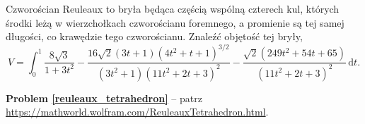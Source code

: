 %

\begin{problem_with_solution}
    \label{reuleaux_tetrahedron}%
    Czworościan Reuleaux to bryła będąca częścią wspólną czterech kul, których środki leżą w wierzchołkach czworościanu foremnego, a promienie są tej samej długości, co krawędzie tego czworościanu.
    Znaleźć objętość tej bryły,
    \begin{equation}
        V = \int_0^1
        \frac{
            8\sqrt{3}
        }{
            1 + 3t^2
        } - \frac{
            16 \sqrt{2} (3t+1) (4t^2 +t+1)^{3/2}
        }{
            (3t^2+1)(11t^2 + 2t + 3)^2
        } - \frac{
            \sqrt{2} (249 t^2 + 54t + 65)
        }{
            (11t^2 + 2t +3)^2
        } \,\mathrm{d} t.
    \end{equation}
\end{problem_with_solution}

\textbf{Problem \ref{reuleaux_tetrahedron}} -- patrz \url{https://mathworld.wolfram.com/ReuleauxTetrahedron.html}.


%